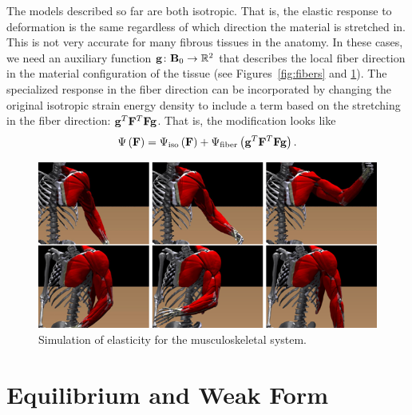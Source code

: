 The models described so far are both isotropic. That is, the elastic response to deformation is the same regardless of which direction the material is stretched in. This is not very accurate for many fibrous tissues in the anatomy. In these cases, we need an auxiliary function $\mathbf{g} \colon \mathbf{B}_0 \to \mathbb{R}^2$ that describes the local fiber direction in the material configuration of the tissue (see Figures~\ref{fig:fibers} and \ref{fig:mucles}). The specialized response in the fiber direction can be incorporated by changing the original isotropic strain energy density to include a term based on the stretching in the fiber direction: $\mathbf{g}^T \mathbf{F}^T \mathbf{F} \mathbf{g}$. That is, the modification looks like
\begin{equation*}
\Psi \left( \mathbf{F} \right) = \Psi_{\text{iso}} \left( \mathbf{F} \right) + \Psi_{\text{fiber}} \left( \mathbf{g}^T \mathbf{F}^T \mathbf{F} \mathbf{g} \right).
\end{equation*}

\begin{figure}
\includegraphics[width=\textwidth]{images/muscles}
\caption{Simulation of elasticity for the musculoskeletal system.}
\label{fig:mucles}
\end{figure}

\section{Equilibrium and Weak Form}

